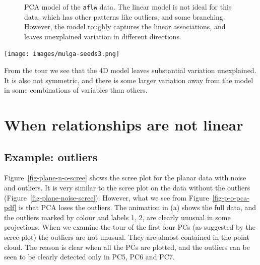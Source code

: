 \documentclass[
  letterpaper,
]{krantz}
\newcommand{\insightbox}[1]{%
\noindent\colorbox{insight!30}{%
\begin{minipage}{0.98\textwidth}%
    \centering%
    \begin{minipage}[c]{0.15\textwidth} %
      \texttt{[image: images/mulga-seeds3.png]} %
    \end{minipage}%
    \hfill %
    \begin{minipage}[c]{0.8\textwidth} %
      \bigskip%
      \textsf{#1}%
      \bigskip%
    \end{minipage}%
    \hspace*{3mm}%
  \end{minipage}%
}%
}
\begin{document}
\begin{figure}


\caption{\label{fig-aflw-model-pdf}PCA model of the \texttt{aflw} data.
The linear model is not ideal for this data, which has other patterns
like outliers, and some branching. However, the model roughly captures
the linear associations, and leaves unexplained variation in different
directions.}

\end{figure}%

\insightbox{From the tour we see that the 4D model leaves substantial variation unexplained. It is also not symmetric, and there is some larger variation away from the model in some combinations of variables than others.}

\section{When relationships are not
linear}\label{when-relationships-are-not-linear}

\subsection{Example: outliers}\label{example-outliers}


Figure~\ref{fig-plane-n-o-scree} shows the scree plot for the planar
data with noise and outliers. It is very similar to the scree plot on
the data without the outliers (Figure~\ref{fig-plane-noise-scree}).
However, what we see from Figure~\ref{fig-p-o-pca-pdf} is that PCA loses
the outliers. The animation in (a) shows the full data, and the outliers
marked by colour and labels 1, 2, are clearly unusual in some
projections. When we examine the tour of the first four PCs (as
suggested by the scree plot) the outliers are not unusual. They are
almost contained in the point cloud. The reason is clear when all the
PCs are plotted, and the outliers can be seen to be clearly detected
only in PC5, PC6 and PC7.
\end{document}
